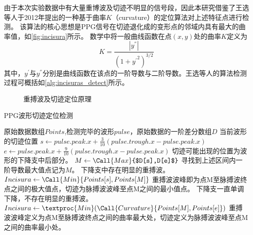 由于本次实验数据中有大量重博波及切迹不明显的信号段，因此本研究借鉴了王选等人于2012年提出的一种基于曲率$K$（curvature）的定位算法对上述特征点进行检测\cite{Wang2012}。
该算法的核心思想是PPG信号在切迹退化成的变形点的邻域内具有最大的曲率值，如\autoref{fig:incisura}所示。
数学中将一般曲线函数在点$(x,y)$处的曲率$K$定义为
\begin{equation}
    \label{equ:curvature}
    K=\frac{|y^{''}|}{{(1+{y^{'}}^2)}^{3/2}}
\end{equation}
其中，$y^{'}$与$y^{''}$分别是曲线函数在该点的一阶导数与二阶导数。王选等人的算法检测过程可概括如\autoref{alg:incisuras_detect}所示\cite{Wang2012}。
\begin{figure}[htbp]
    \centering
    \quad
    \caption[重搏波及切迹定位原理]{\label{fig:incisura}重搏波及切迹定位原理\cite{Wang2012,Su2014}}
\end{figure}

\begin{breakablealgorithm}
    \caption{PPG波形切迹定位检测}
    \label{alg:incisuras_detect}
    \begin{algorithmic}[1] %
        \Require 原始数据数组$Points$,检测完毕的波形$pulse$，原始数据的一阶差分数组$D$
        \Ensure 当前波形的切迹位置
            \State $s \gets pulse.peak.x + \frac{3}{10}(pulse.trough.x-pulse.peak.x)$
            \State $e \gets pulse.peak.x + \frac{9}{10}(pulse.trough.x-pulse.peak.x)$
            \State \Comment 切迹可能出现的位置为波形的下降支中后部分。
            \State $M  \gets \Call{Max}{$D[s],D[e]$}$
            \State \Comment 寻找到上述区间内一阶导数最大值点记为$M$。
                \State \Comment 下降支中存在明显的重搏波。
                \State $Incisura \gets \Call{Min}{Points[s],Points[M]}$
                \State \Comment 重搏波波峰即为点M至脉搏波终点之间的极大值点，切迹为脉搏波波峰至点M之间的最小值点。
            \Else
                \State \Comment 下降支一直单调下降，不存在明显的重搏波。
                \State $Incisura \gets \textproc{Min}({\Call{Curvature}{Points[M],Points[e]}})$
                \State \Comment 重搏波波峰定义为点M至脉搏波终点之间的曲率最大处，切迹定义为脉搏波波峰至点M之间的曲率最小处。
            \EndIf
            \State {}
        \EndFunction
    \end{algorithmic}
\end{breakablealgorithm}

